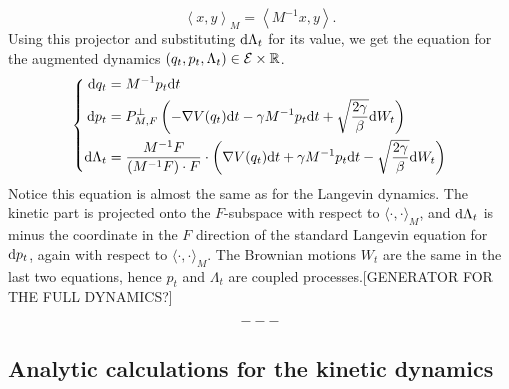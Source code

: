 \begin{equation}
    \label{eq:norton_weighted_scalar_product}
    \left\langle x,y\right\rangle_{M}=\left\langle M^{-1}x,y\right\rangle.
\end{equation}
Using this projector and substituting $\mathrm{d} \Lambda_t$ for its value, we get the equation for the augmented dynamics $(q_t,p_t,\Lambda_t)\in \mathcal E\times \mathbb{R}$.
\begin{equation}
    \label{eq:norton_final_sde}
    \left\{\begin{aligned}
        \mathrm{d} q_t &= M^{-1}p_t\mathrm{d} t\\
        \mathrm{d} p_t &= P_{M,F}^\perp\left(-\nabla V(q_t)\mathrm{d} t -\gamma M^{-1}p_t\mathrm{d} t +\sqrt{\frac{2\gamma}\beta}\mathrm{d} W_t\right)\\
        \mathrm{d} \Lambda_t &=\frac{M^{-1}F}{\left(M^{-1}F\right)\cdot F}\cdot\left(\nabla V(q_t)\mathrm{d} t +\gamma M^{-1}p_t\mathrm{d} t-\sqrt{\frac{2\gamma}\beta}\mathrm{d} W_t\right)
    \end{aligned}\right.
\end{equation}
Notice this equation is almost the same as for the Langevin dynamics.
The kinetic part is projected onto the $F$-subspace with respect to $\langle \cdot,\cdot\rangle_M$, and $\mathrm{d}\Lambda_t$ is minus the coordinate in the $F$ direction of the standard Langevin equation for $\mathrm{d} p_t$, again with respect to $\langle \cdot ,\cdot \rangle_M$.
The Brownian motions $W_t$ are the same in the last two equations, hence $p_t$ and $\Lambda_t$ are coupled processes.[GENERATOR FOR THE FULL DYNAMICS?]

\begin{equation}
    \label{eq:norton_generator}
---
\end{equation}

\subsection{Analytic calculations for the kinetic dynamics}

